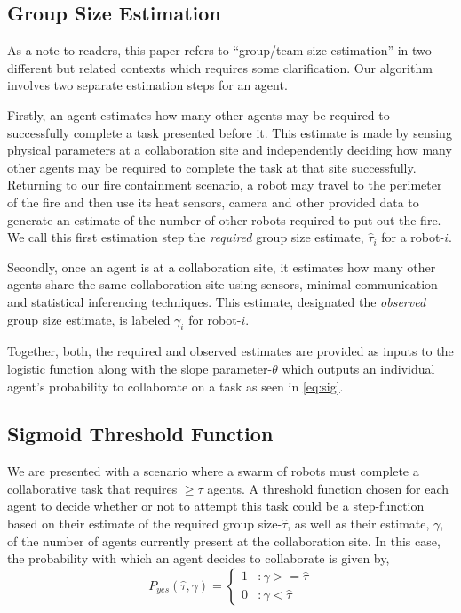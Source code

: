 \documentclass[conference]{ieeeconf}
\def\estt{\hat{\tau}}
\def\estg{\gamma}
\begin{document}
\subsection{Group Size Estimation}\label{sec:gpsizeest}
As a note to readers, this paper refers to ``group/team size estimation'' in two different but related contexts which requires some clarification. Our algorithm involves two separate estimation steps for an agent. 

Firstly, an agent estimates how many other agents may be required to successfully complete a task presented before it. This estimate is made by sensing physical parameters at a collaboration site and independently deciding how many other agents may be required to complete the task at that site successfully. Returning to our fire containment scenario, a robot may travel to the perimeter of the fire and then use its heat sensors, camera and other provided data to generate an estimate of the number of other robots required to put out the fire. We call this first estimation step the \emph{required} group size estimate, $\estt_i$ for a robot-$i$.

Secondly, once an agent is at a collaboration site, it estimates how many other agents share the same collaboration site using sensors, minimal communication and statistical inferencing techniques. This estimate, designated the \emph{observed} group size estimate, is labeled $\estg_i$ for robot-$i$.

Together, both, the required and observed estimates are provided as inputs to the logistic function along with the slope parameter-$\theta$ which outputs an individual agent's probability to collaborate on a task as seen in \eqref{eq:sig}.

\subsection{Sigmoid Threshold Function}\label{sec:sig}
We are presented with a scenario where a swarm of robots must complete a collaborative task that requires $\geq \tau$ agents. A threshold function chosen for each agent to decide whether or not to attempt this task could be a step-function based on their estimate of the required group size-$\estt$, as well as their estimate, $\estg$, of the number of agents currently present at the collaboration site. In this case, the probability with which an agent decides to collaborate is given by, 
\begin{equation}\label{eq:step}
	P_{yes}(\estt,\estg) = \left\{
	\begin{array}{ll}
		1 & : \estg >= \estt\\ 
		0 & : \estg < \estt
	\end{array}\right.
\end{equation}
\end{document}
